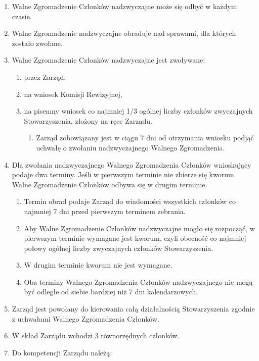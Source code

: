 \documentclass{article}
\begin{document}
\begin{enumerate}
\begin{enumerate}
      \end{enumerate}
    \item Walne Zgromadzenie Członków nadzwyczajne może się odbyć w każdym czasie.
    \item Walne Zgromadzenie nadzwyczajne obraduje nad sprawami, dla których zostało zwołane.
    \item Walne Zgromadzenie Członków nadzwyczajne jest zwoływane:
      \begin{enumerate}
        \item przez Zarząd,
        \item na wniosek Komisji Rewizyjnej,
        \item na pisemny wniosek co najmniej 1/3 ogólnej liczby członków zwyczajnych Stowarzyszenia, złożony na ręce Zarządu.
          \begin{enumerate}
            \item Zarząd zobowiązany jest w ciągu 7 dni od otrzymania wniosku podjąć uchwałę o zwołaniu nadzwyczajnego Walnego Zgromadzenia.
          \end{enumerate}
        \end{enumerate}
    \item Dla zwołania nadzwyczajnego Walnego Zgromadzenia Członków wnioskujący podaje dwa terminy. Jeśli w pierwszym terminie nie zbierze się kworum Walne Zgromadzenie Członków odbywa się w drugim terminie.
      \begin{enumerate}
        \item Termin obrad podaje Zarząd do wiadomości wszystkich członków co najmniej 7 dni przed pierwszym terminem zebrania.
        \item Aby Walne Zgromadzenie Członków nadzwyczajne mogło się rozpocząć, w pierwszym terminie wymagane jest kworum, czyli obecność co najmniej połowy ogólnej liczby zwyczajnych członków Stowarzyszenia.
        \item W drugim terminie kworum nie jest wymagane.
        \item Oba terminy Walnego Zgromadzenia Członków nadzwyczajnego nie mogą być odległe od siebie bardziej niż 7 dni kalendarzowych.
      \end{enumerate}
    \item Zarząd jest powołany do kierowania całą działalnością Stowarzyszenia zgodnie z uchwałami Walnego Zgromadzenia Członków.
    \item W skład Zarządu wchodzi 3 równorzędnych członków.
    \item Do kompetencji Zarządu należą:

\end{enumerate}
\end{document}
